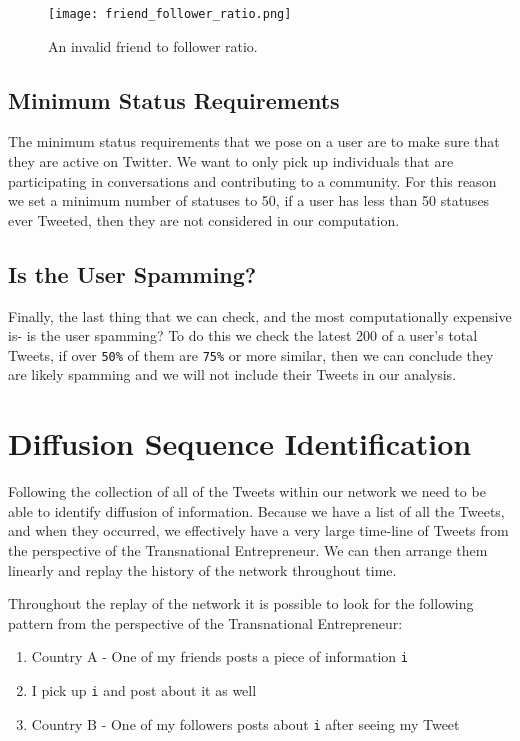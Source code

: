 \begin{figure}[H]
  \centering
  \texttt{[image: friend\_follower\_ratio.png]}
  \caption{An invalid friend to follower ratio.}
\end{figure}


\subsection{Minimum Status Requirements}
The minimum status requirements that we pose on a user are to make
sure that they are active on Twitter. We want to only pick up
individuals that are participating in conversations and contributing
to a community. For this reason we set a minimum number of statuses to
50, if a user has less than 50 statuses ever Tweeted, then they are
not considered in our computation.

\subsection{Is the User Spamming?}
Finally, the last thing that we can check, and the most
computationally expensive is- is the user spamming? To do this we
check the latest 200 of a user's total Tweets, if over \verb|50%| of
them are \verb|75%| or more similar, then we can conclude they are
likely spamming and we will not include their Tweets in our analysis.

\section{Diffusion Sequence Identification}
Following the collection of all of the Tweets within our network we
need to be able to identify diffusion of information. Because we have
a list of all the Tweets, and when they occurred, we effectively have a
very large time-line of Tweets from the perspective of the
Transnational Entrepreneur. We can then arrange them linearly and
replay the history of the network throughout time.

Throughout the replay of the network it is possible to look for the
following pattern from the perspective of the Transnational
Entrepreneur:

\begin{enumerate}
\item Country A - One of my friends posts a piece of information \verb|i| 
\item I pick up \verb|i| and post about it as well
\item Country B - One of my followers posts about \verb|i| after seeing my Tweet
\end{enumerate}


